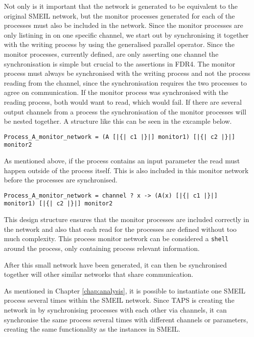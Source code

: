 Not only is it important that the network is generated to be equivalent to the original SMEIL network, but the monitor processes generated for each of the \cspm{} processes must also be included in the network. Since the monitor processes are only listining in on one specific channel, we start out by synchronising it together with the writing process by using the generalised parallel operator. Since the monitor processes, currently defined, are only asserting one channel the synchronisation is simple but crucial to the assertions in FDR4.
The monitor process must always be synchronised with the writing process and not the process reading from the channel, since the synchronisation requires the two processes to agree on communication. If the monitor process was synchronised with the reading process, both would want to read, which would fail.
If there are several output channels from a process the synchronisation of the monitor processes will be nested together. A structure like this can be seen in the excample below.
\begin{verbatim}
Process_A_monitor_network = (A [|{| c1 |}|] monitor1) [|{| c2 |}|] monitor2
\end{verbatim}
As mentioned above, if the process contains an input parameter the read must happen outside of the process itself. This is also included in this monitor network before the processes are synchronised.
\begin{verbatim}
Process_A_monitor_network = channel ? x -> (A(x) [|{| c1 |}|] monitor1) [|{| c2 |}|] monitor2
\end{verbatim}
This design structure ensures that the monitor processes are included correctly in the network and also that each read for the processes are defined without too much complexity. This process monitor network can be considered a \texttt{shell} around the process, only containing process relevant information.

After this small network have been generated, it can then be synchronised together will other similar networks that share communication.


As mentioned in Chapter \ref{chap:analysis}, it is possible to instantiate one SMEIL process several times within the SMEIL network. Since TAPS is creating the network in \cspm{} by synchronising processes with each other via channels, it can synchronise the same process several times with different channels or parameters, creating the same functionality as the instances in SMEIL.\\
